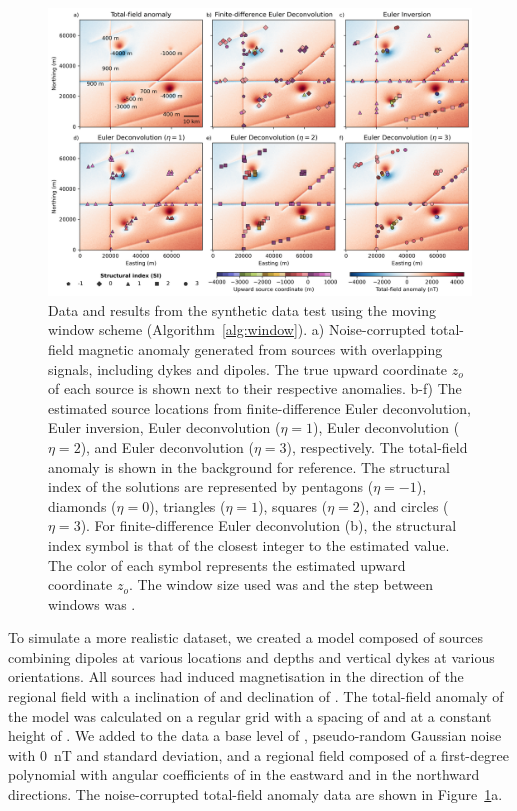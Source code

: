 \begin{figure}[tb!]
\centering
\includegraphics[width=1\linewidth]{figures/synthetic-windows.png}
\caption{
    Data and results from the synthetic data test using the moving window
    scheme (Algorithm~\ref{alg:window}).
    a) Noise-corrupted total-field magnetic anomaly generated from
    \SynWinNSources{} sources with overlapping signals, including dykes and
    dipoles. The true upward coordinate $z_o$ of each source is shown next to
    their respective anomalies.
    b-f) The estimated source locations from finite-difference Euler
    deconvolution, Euler inversion, Euler deconvolution ($\eta=1$), Euler
    deconvolution ($\eta=2$), and Euler deconvolution ($\eta=3$), respectively.
    The total-field anomaly is shown in the background for reference.
    The structural index of the solutions are represented by pentagons
    ($\eta=-1$),  diamonds ($\eta=0$),  triangles ($\eta=1$),  squares
    ($\eta=2$), and circles ($\eta=3$).
    For finite-difference Euler deconvolution (b), the structural index symbol
    is that of the closest integer to the estimated value.
    The color of each symbol represents the estimated upward coordinate $z_o$.
    The window size used was \SynWinWindowSize{} and the step between windows
    was \SynWinWindowStep{}.
}
\label{fig:windows}
\end{figure}

To simulate a more realistic dataset, we created a model composed of
\SynWinNSources{} sources combining dipoles at various locations and depths and
vertical dykes at various orientations.
All sources had induced magnetisation in the direction of the regional field
with a inclination of \SynWinInc{} and declination of \SynWinDec{}.
The total-field anomaly of the model was calculated on a regular grid with
a spacing of \SynWinSpacing{} and at a constant height of \SynWinHeight{}.
We added to the data a base level of \SynWinBase{}, pseudo-random Gaussian
noise with \qty{0}{\nano\tesla} and \SynWinNoise{} standard deviation, and
a regional field composed of a first-degree polynomial with angular
coefficients of \SynWinRegionalE{} in the eastward and \SynWinRegionalN{} in
the northward directions.
The noise-corrupted total-field anomaly data are shown in
Figure~\ref{fig:windows}a.

